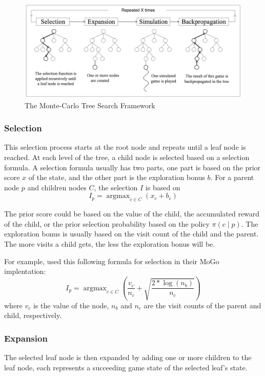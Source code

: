 \documentclass[12pt]{article}
\begin{document}
\begin{figure}[h]
    \centering
    \includegraphics[scale=0.5]{assets/mcts.png}
    \caption[]{The Monte-Carlo Tree Search Framework}
    \label{fig:mcts}
\end{figure}

\subsubsection{Selection}
This selection process starts at the root node and repeats until a leaf node is reached.
At each level of the tree, a child node is selected based on a selection formula.
A selection formula usually has two parts, one part is based on the prior score $x$ of the state, and the other part is the exploration bonus $b$.
For a parent node $p$ and children nodes $C$, the selection $I$ is based on
$$I_p = \operatorname{argmax}_{c \in C} \left( x_c + b_c \right)$$

The prior score could be based on the value of the child, the accumulated reward of the child, or the prior selection probability based on the policy $\pi(c \mid p)$.
The exploration bonus is usually based on the visit count of the child and the parent.
The more visits a child gets, the less the exploration bonus will be.

For example, \citeauthor{ModificationUCTPatterns_Gelly.Wang.ea_2006} used this following formula for selection in their MoGo implentation:
$$
    I_p = \operatorname{argmax}_{c \in C} \left( \frac{v_c}{n_c} + \sqrt{\frac{2 * \log(n_b)}{n_c} } \right)
$$
where $v_c$ is the value of the node, $n_b$ and $n_c$ are the visit counts of the parent and child, respectively.

\subsubsection{Expansion}
The selected leaf node is then expanded by adding one or more children to the leaf node, each represents a succeeding game state of the selected leaf's state.
\end{document}
